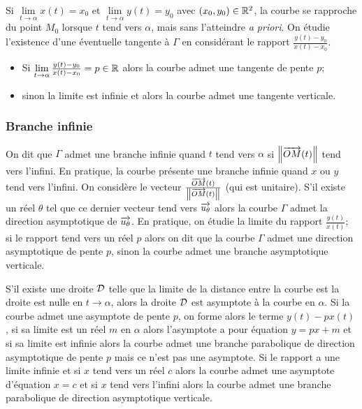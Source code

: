 Si \(\lim\limits_{t \to \alpha}{x(t)}=x_0\) et \(\lim\limits_{t \to 
\alpha}{y(t)} = y_0\) avec \((x_0, y_0) \in \mathbb{R}^2\), la courbe se rapproche du 
point \(M_0\) lorsque \(t\) tend vers \(\alpha\), mais sans l'atteindre \emph{a 
priori}. On étudie l'existence d'une éventuelle tangente à \(\Gamma\) en 
considérant le rapport \(\frac{y(t) - y_0}{x(t) - x_0}\).
\begin{itemize}
  \item Si \(\lim\limits_{t \to \alpha}\frac{y(t) - y_0}{x(t) - x_0}=p \in \mathbb{R}\) 
    alors la courbe admet une tangente de pente \(p\);
  \item sinon la limite est infinie et alors la courbe admet une tangente 
    verticale.
\end{itemize}

\subsubsection{Branche infinie}

On dit que \(\Gamma\) admet une branche infinie quand \(t\) tend vers \(\alpha\) 
si \(\left\lVert\overrightarrow{OM}(t)\right\rVert\) tend vers l'infini. En pratique, la courbe présente 
une branche infinie quand \(x\) ou \(y\) tend vers l'infini. On considère le 
vecteur \(\frac{\overrightarrow{OM}(t)}{\left\lVert\overrightarrow{OM}(t)\right\rVert}\) (qui est unitaire). S'il 
existe un réel \(\theta\) tel que ce dernier vecteur tend vers 
\(\overrightarrow{u_\theta}\) alors la courbe \(\Gamma\) admet la direction asymptotique 
de \(\overrightarrow{u_\theta}\). En pratique, on étudie la limite du rapport 
\(\frac{y(t)}{x(t)}\); si le rapport tend vers un réel \(p\) alors on dit que la 
courbe \(\Gamma\) admet une direction asymptotique de pente \(p\), sinon la 
courbe admet une branche asymptotique verticale.

S'il existe une droite \(\mathcal{D}\) telle que la limite de la distance entre la 
courbe est la droite est nulle en \(t \to \alpha\), alors la droite \(\mathcal{D}\) est 
asymptote à la courbe en \(\alpha\). Si la courbe admet une asymptote de pente 
\(p\), on forme alors le terme \(y(t) - px(t)\), si sa limite est un réel \(m\) 
en \(\alpha\) alors l'asymptote a pour équation \(y = px + m\) et si sa limite 
est infinie alors la courbe admet une branche parabolique de direction 
asymptotique de pente \(p\) mais ce n'est pas une asymptote. Si le rapport a une 
limite infinie et si \(x\) tend vers un réel \(c\) alors la courbe admet une 
asymptote d'équation \(x = c\) et si \(x\) tend vers l'infini alors la courbe 
admet une branche parabolique de direction asymptotique verticale.

